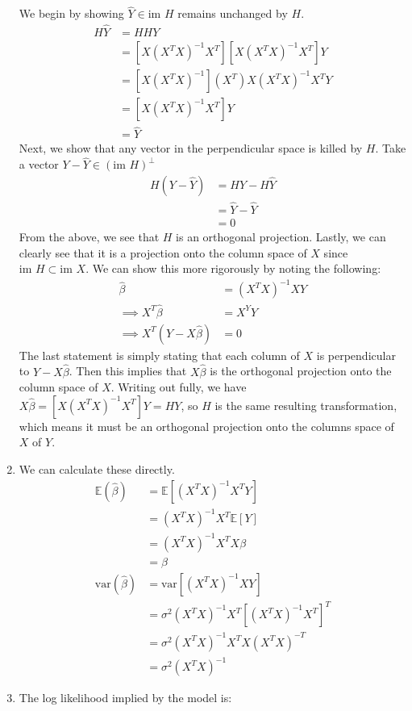 \documentclass[submit]{harvardml}
\newcommand{\E}{\mathbb{E}}
\newcommand{\var}{\text{var}}
\theoremstyle{plain}
\begin{document}
\begin{enumerate}[label=(\alph*)]
We begin by showing $\hat{Y} \in \text{im } H$ remains unchanged by $H$.
\begin{align*}
H\hat{Y} &= HHY \\
&= [X(X^TX)^{-1}X^T][X(X^TX)^{-1}X^T]Y \\
&= [X(X^TX)^{-1}](X^T)X(X^TX)^{-1}X^TY \\
&= [X(X^TX)^{-1}X^T]Y \\
&= \hat{Y}
\end{align*}
Next, we show that any vector in the perpendicular space is killed by $H$. Take a vector $Y - \hat{Y} \in (\text{im } H)^{\bot}$
\begin{align*}
H(Y - \hat{Y}) &= HY - H\hat{Y} \\
&= \hat{Y} - \hat{Y}\\
&= 0
\end{align*}
From the above, we see that $H$ is an orthogonal projection. Lastly, we can clearly see that it is a projection onto the column space of $X$ since $\text{im } H \subset \text{im } X$. We can show this more rigorously by noting the following:
\begin{align*}
\hat{\beta} &= (X^TX)^{-1}XY \\
\implies X^T\hat{\beta} &= X^YY \\
\implies X^T(Y - X\hat{\beta}) &= 0
\end{align*}
The last statement is simply stating that each column of $X$ is perpendicular to $Y - X\hat{\beta}$. Then this implies that $X\hat{\beta}$ is the orthogonal projection onto the column space of $X$. Writing out fully, we have $X\hat{\beta} = [X(X^TX)^{-1}X^T]Y = HY$, so $H$ is the same resulting transformation, which means it must be an orthogonal projection onto the columns space of $X$ of $Y$.
\item We can calculate these directly.
\begin{align*}
\E(\hat{\beta}) &= \E[(X^TX)^{-1}X^TY] \\
&= (X^TX)^{-1}X^T\E[Y] \\
&= (X^TX)^{-1}X^TX\beta \\
&= \beta \\
\var({\hat{\beta}}) &= \var[(X^TX)^{-1}XY] \\
 &= \sigma^2(X^TX)^{-1}X^T[(X^TX)^{-1}X^T]^T \\
 &= \sigma^2(X^TX)^{-1}X^TX(X^TX)^{-T} \\
 &= \sigma^2(X^TX)^{-1}
\end{align*}
\item The log likelihood implied by the model is:

\end{enumerate}
\end{document}
